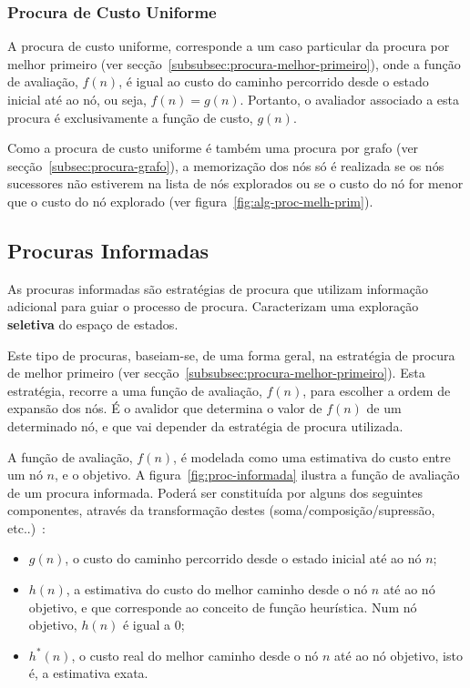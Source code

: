\subsubsection{Procura de Custo Uniforme}\label{subsubsec:procura-custo-uniforme}

A procura de custo uniforme, corresponde a um caso particular da procura por melhor primeiro (ver secção~\ref{subsubsec:procura-melhor-primeiro}), onde a função de avaliação, $f(n)$, é igual ao custo do caminho percorrido desde o estado inicial até ao nó, ou seja, $f(n) = g(n)$.
Portanto, o avaliador associado a esta procura é exclusivamente a função de custo, $g(n)$.

Como a procura de custo uniforme é também uma procura por grafo (ver secção~\ref{subsec:procura-grafo}), a memorização dos nós só é realizada se os nós sucessores não estiverem na lista de nós explorados ou se o custo do nó for menor que o custo do nó explorado (ver figura~\ref{fig:alg-proc-melh-prim}).

\subsection{Procuras Informadas}\label{subsec:procuras-informadas}

As procuras informadas são estratégias de procura que utilizam informação adicional para guiar o processo de procura.
Caracterizam uma exploração \textbf{seletiva} do espaço de estados.

Este tipo de procuras, baseiam-se, de uma forma geral, na estratégia de procura de melhor primeiro (ver secção~\ref{subsubsec:procura-melhor-primeiro}).
Esta estratégia, recorre a uma função de avaliação, $f(n)$, para escolher a ordem de expansão dos nós.
É o avalidor que determina o valor de $f(n)$ de um determinado nó, e que vai depender da estratégia de procura utilizada.

A função de avaliação, $f(n)$, é modelada como uma estimativa do custo entre um nó $n$, e o objetivo.
A figura~\ref{fig:proc-informada} ilustra a função de avaliação de um procura informada.
Poderá ser constituída por alguns dos seguintes componentes, através da transformação destes (soma/composição/supressão, etc..)~\cite{ist:leic:resumos:procura-informada}:

\begin{itemize}
    \item $g(n)$, o custo do caminho percorrido desde o estado inicial até ao nó $n$;
    \item $h(n)$, a estimativa do custo do melhor caminho desde o nó $n$ até ao nó objetivo,
    e que corresponde ao conceito de função heurística.
    Num nó objetivo, $h(n)$ é igual a 0;
    \item $h^*(n)$, o custo real do melhor caminho desde o nó $n$ até ao nó objetivo, isto é, a estimativa exata.
\end{itemize}

